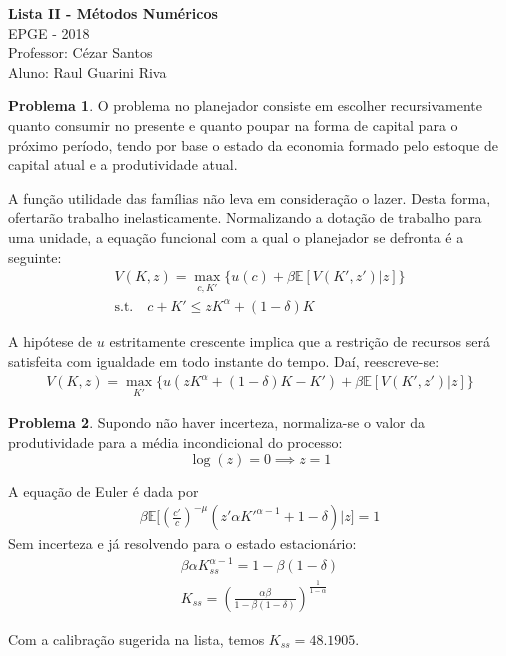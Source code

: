 \documentclass[11pt]{article}
\theoremstyle{definition}
\theoremstyle{definition}
\newtheorem{problema}{Problema}
\newcommand{\E}{\mathbb{E}}
\theoremstyle{solution}
\begin{document}
	\begin{center}
		{\Large{\textbf{Lista II - Métodos Numéricos}}}\\
		\vspace{0.2cm}
		EPGE - 2018\\
		Professor: Cézar Santos\\
		Aluno: Raul Guarini Riva
	\end{center}

\begin{problema}
	O problema no planejador consiste em escolher recursivamente quanto consumir no presente e quanto poupar na forma de capital para o próximo período, tendo por base o estado da economia formado pelo estoque de capital atual e a produtividade atual. 
	
	A função utilidade das famílias não leva em consideração o lazer. Desta forma, ofertarão trabalho inelasticamente. Normalizando a dotação de trabalho para uma unidade, a equação funcional com a qual o planejador se defronta é a seguinte:
	\begin{gather*}
		V(K, z) = \max\limits_{c, K'} \{u(c) + \beta\E[V(K', z')|z] \} \\
		\text{s.t.} \quad c + K' \leq zK^{\alpha} + (1-\delta)K
	\end{gather*}
	
	A hipótese de $u$ estritamente crescente implica que a restrição de recursos será satisfeita com igualdade em todo instante do tempo. Daí, reescreve-se:
	\begin{gather*}
		V(K,z) = \max\limits_{K'}\{u(zK^{\alpha} + (1-\delta)K - K') + \beta\E[V(K', z')|z]\}
	\end{gather*}
\end{problema}

\begin{problema}
	Supondo não haver incerteza, normaliza-se o valor da produtividade para a média incondicional do processo:
	\begin{equation*}
		\log(z) = 0 \implies z = 1
	\end{equation*}
	
	A equação de Euler é dada por
	\begin{gather*}
		\beta\E\bigg[\left(\frac{c'}{c}\right)^{-\mu}(z'\alpha K'^{\alpha - 1} + 1 - \delta)\big|z\bigg] = 1
	\end{gather*}
	Sem incerteza e já resolvendo para o estado estacionário:
	\begin{gather*}
		\beta\alpha K^{\alpha -1}_{ss} = 1 - \beta(1-\delta)\\
		\boxed{K_{ss} = \left(\frac{\alpha\beta}{1 - \beta(1-\delta)} \right)^{\frac{1}{1-\alpha}}}
	\end{gather*}
	
	Com a calibração sugerida na lista, temos $K_{ss} = 48.1905$.
\end{problema}
\end{document}

